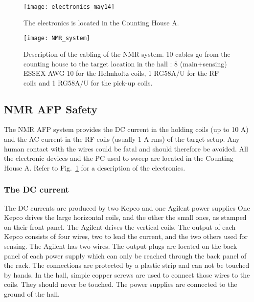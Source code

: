 {\begin{figure}
\begin{center}
\centerline{\texttt{[image: electronics\_may14]}}
\caption{The electronics is located in
the Counting House A.}
\end{center}
\label{fig2:electronics_new}
\end{figure}

\begin{figure}
\begin{center}
\centerline{\texttt{[image: NMR\_system]}}
\caption[Cabling of the NMR system]%
{Description of the cabling of the NMR system.
10 cables go from the counting house to the target location
in the hall : 8 (main+sensing) ESSEX AWG 10 for
the Helmholtz coils, 1 RG58A/U for the RF coils and 1 RG58A/U for the
pick-up coils.}
\end{center}
\label{fig3:cabling}
\end{figure}

\begin{safetyen}{10}{5}
\subsection{NMR AFP Safety }

The NMR AFP system provides the DC current in the holding coils (up to
10 A) and the AC current in the RF 
coils (usually 1 A rms) of the target setup. Any human contact with the
wires could be fatal and should 
therefore be avoided. All the electronic devices and the PC used
to sweep are located in the Counting House A.
Refer to Fig.~\ref{fig2:electronics_new} for a description of the
electronics.

\subsubsection{ The DC current}


The DC currents are produced by two Kepco and one Agilent power supplies
One Kepco drives the large horizontal coils, and the other the small ones, 
as stamped on their front panel. The Agilent drives the vertical coils.
The output of each Kepco consists of four wires,
two to lead the current, 
and the two others used for sensing. The Agilent has two wires.
The output plugs are located
on the back panel of each power 
supply which can only be reached through the back
panel of the rack. The connections are protected by a plastic strip and
can not be touched by hands. 
In the hall, simple copper screws are used to connect those wires to the
coils. They should never be 
touched. The power supplies are connected to the ground of the hall.  


\end{safetyen}}
